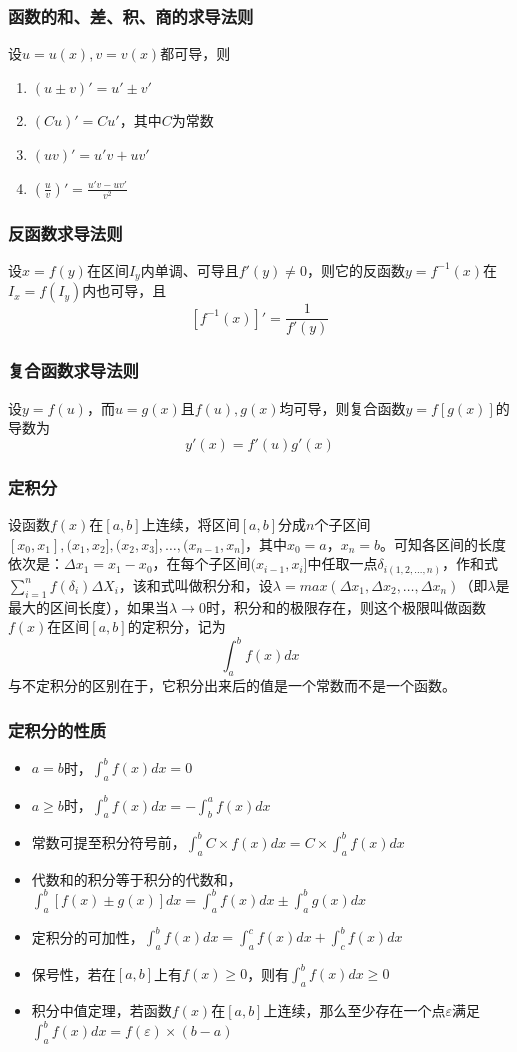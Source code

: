 \documentclass[UTF-8]{ctexart}
\begin{document}
			\subsubsection{函数的和、差、积、商的求导法则}
			设$u=u(x),v=v(x)$都可导，则  
			
			\begin{enumerate}
				\item $(u \pm v)'=u' \pm v'$
				\item $(Cu)'=Cu'$，其中$C$为常数
				\item $(uv)'=u'v+uv'$
				\item $(\frac{u}{v})'=\frac{u'v-uv'}{v^2}$
			\end{enumerate}
			\subsubsection{反函数求导法则}
			设$x=f(y)$在区间$I _ y$内单调、可导且$f'(y)\ne 0$，则它的反函数$y=f^{-1}(x)$在$I _ x=f(I _ y)$内也可导，且
			$$[f^{-1}(x)]'=\frac{1}{f'(y)}$$
			\subsubsection{复合函数求导法则}
			设$y=f(u)$，而$u=g(x)$且$f(u),g(x)$均可导，则复合函数$y=f[g(x)]$的导数为
			$$y'(x)=f'(u) g'(x)$$
			\subsubsection{定积分}
			设函数$f(x)$在$[a,b]$上连续，将区间$[a,b]$分成$n$个子区间$[x _ 0,x _ 1], (x _ 1,x _ 2], (x _ 2,x _ 3], …, (x _ {n-1},x _ n]$，其中$x _ 0=a，x _ n=b$。可知各区间的长度依次是：$\Delta x _ 1=x _ 1-x _ 0$，在每个子区间$(x _ {i-1},x _ i]$中任取一点$\delta  _ {i(1,2,...,n)}$，作和式$\sum _ {i=1}^{n}f(\delta _ i) \Delta X _ i$，该和式叫做积分和，设$\lambda=max(\Delta x _ 1, \Delta x _ 2, …, \Delta x _ n)$（即$\lambda$是最大的区间长度），如果当$\lambda→0$时，积分和的极限存在，则这个极限叫做函数$f(x)$在区间$[a,b]$的定积分，记为  
			$$\int _ {a}^{b} f(x)dx$$  
			与不定积分的区别在于，它积分出来后的值是一个常数而不是一个函数。
			\subsubsection{定积分的性质}
			\begin{itemize}
				\item $a=b$时，$\int _ a^b f(x)dx=0$
				\item $a \ge b$时，$\int _ a^b f(x)dx=-\int _ b^a f(x)dx$
				\item 常数可提至积分符号前，$\int _ a^b C \times f(x)dx=C \times \int _ a^b f(x)dx$
				\item 代数和的积分等于积分的代数和，$\int _ a^b [f(x)\pm g(x)]dx=\int _ a^b f(x)dx\pm\int _ a^b g(x)dx$
				\item 定积分的可加性，$\int _ a^b f(x)dx=\int _ a^c f(x)dx+\int _ c^b f(x)dx$
				\item 保号性，若在$[a,b]$上有$f(x) \ge 0$，则有$\int _ a^b f(x)dx \ge 0$
				\item 积分中值定理，若函数$f(x)$在$[a,b]$上连续，那么至少存在一个点$\varepsilon$满足$\int _ a^b f(x)dx=f(\varepsilon) \times (b-a)$
			\end{itemize}
\end{document}
